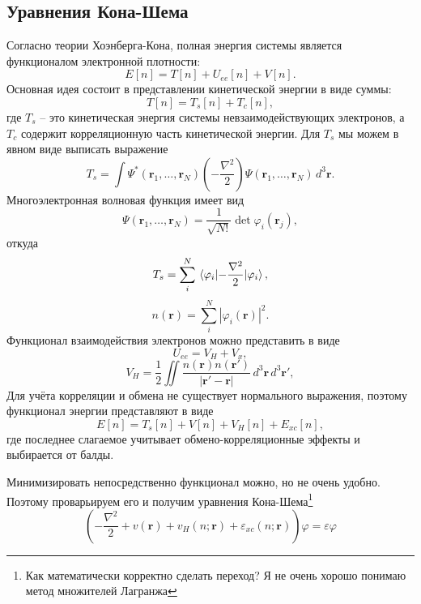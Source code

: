 \documentclass[article]{ncc}
\newcommand{\eps}{\varepsilon}
\renewcommand{\phi}{\varphi}
\renewcommand{\vec}{\boldsymbol}
\begin{document}
    \subsection{Уравнения Кона-Шема}
    Согласно теории Хоэнберга-Кона, полная энергия системы является функционалом электронной плотности:
    \begin{equation}
        E[n] = T[n] + U_{ee}[n] + V[n].
    \end{equation}
    Основная идея состоит в представлении кинетической энергии в виде суммы:
    \begin{equation}
        T[n] = T_s[n] + T_c[n],
    \end{equation}
    где \( T_s \) -- это кинетическая энергия системы невзаимодействующих электронов, а \( T_c \) содержит корреляционную часть кинетической энергии. Для \( T_s \) мы можем в явном виде выписать выражение
    \begin{equation}
        T_s = \int \Psi^*(\vec{r}_1, \ldots, \vec{r}_N) \left(-\frac{\nabla^2}{2}\right) \Psi(\vec{r}_1, \ldots, \vec{r}_N)\,d^3\vec{r}.
    \end{equation}
    Многоэлектронная волновая функция имеет вид
    \begin{equation}
        \Psi(\vec{r}_1, \ldots, \vec{r}_N) = \frac{1}{\sqrt{N!}}\det \phi_i(\vec{r}_j),
    \end{equation}
    откуда
    \begin{equation}
        T_s = \sum_{i}^N\expval{-\frac{\nabla^2}{2}}{\phi_i},
    \end{equation}
    \begin{equation}
        n(\vec{r}) = \sum_{i}^N|\phi_i(\vec{r})|^2.
    \end{equation}
    Функционал взаимодействия электронов можно представить в виде
    \begin{equation}
        U_{ee} = V_H + V_x,
    \end{equation}
    \begin{equation}
        V_H = \frac{1}{2}\iint \frac{n(\vec{r})n(\vec{r}')}{|\vec{r}' - \vec{r}|}\,d^3\vec{r}\,d^3\vec{r}',
    \end{equation}
    Для учёта корреляции и обмена не существует нормального выражения, поэтому функционал энергии представляют в виде
    \begin{equation}
        E[n] = T_s[n] + V[n] + V_H[n] + E_{xc}[n],
    \end{equation}
    где последнее слагаемое учитывает обмено-корреляционные эффекты и выбирается от балды.
    
    Минимизировать непосредственно функционал можно, но не очень удобно. Поэтому проварьируем его и получим уравнения Кона-Шема\footnote{Как математически корректно сделать переход? Я не очень хорошо понимаю метод множителей Лагранжа}
    \begin{equation}
        \left(-\frac{\nabla^2}{2} + v(\vec{r}) + v_H(n;\vec{r}) + \eps_{xc}(n;\vec{r})\right)\phi = \eps\phi
    \end{equation}
\end{document}
